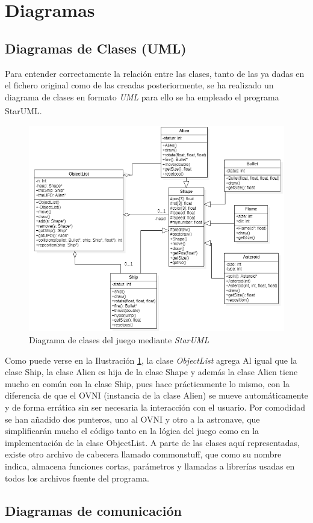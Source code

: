\section{Diagramas}
\subsection{Diagramas de Clases (UML)}
Para entender correctamente la relación entre las clases, tanto de las ya dadas en el fichero original como de las creadas posteriormente, se ha realizado un diagrama de clases en formato \emph{UML} para ello se ha empleado el programa StarUML\textsuperscript{\textregistered}.

\begin{figure}[h]
    \centering
    \includegraphics[width=\textwidth]{fotos/UML.PNG}
    \caption{Diagrama de clases del juego mediante \emph{StarUML}}
    \label{uml}
    \end{figure}

Como puede verse en la Ilustración \ref{uml}, la clase \emph{ObjectList} agrega  Al igual que la clase Ship, la clase Alien es hija de la clase Shape y además la clase Alien tiene mucho en común con la clase Ship, pues hace prácticamente lo mismo, con la diferencia de que el OVNI (instancia de la clase Alien) se mueve automáticamente y de forma errática sin ser necesaria la interacción con el usuario. Por comodidad se han añadido dos punteros, uno al OVNI y otro a la astronave, que simplificarán mucho el código tanto en la lógica del juego como en la implementación de la clase ObjectList.
A parte de las clases aquí representadas, existe otro archivo de cabecera llamado commonstuff, que como su nombre indica, almacena funciones cortas, parámetros y llamadas a librerías usadas en todos los archivos fuente del programa.
\subsection{Diagramas de comunicación}



